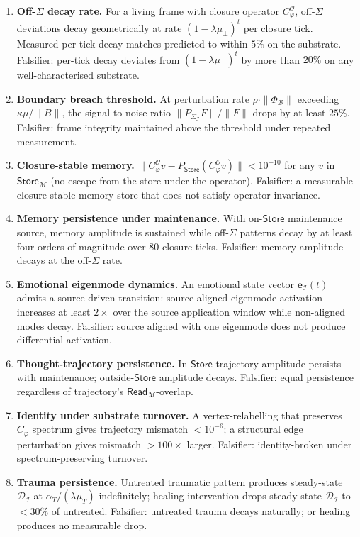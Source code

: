 \documentclass[11pt]{article}
\theoremstyle{plain}
\theoremstyle{definition}
\theoremstyle{remark}
\newcommand{\Ical}{\mathcal{I}}
\newcommand{\Ocal}{\mathcal{O}}
\newcommand{\Mcal}{\mathcal{M}}
\newcommand{\Bcal}{\mathcal{B}}
\newcommand{\Dcal}{\mathcal{D}}
\newcommand{\Cph}{C_\varphi}
\begin{document}
\begin{enumerate}[leftmargin=2em, label=\textbf{P\arabic*.}]
\item \textbf{Off-$\Sigma$ decay rate.} For a living frame with closure operator $\Cph^\Ocal$, off-$\Sigma$ deviations decay geometrically at rate $(1 - \lambda \mu_\perp)^t$ per closure tick. Measured per-tick decay matches predicted to within $5\%$ on the substrate. Falsifier: per-tick decay deviates from $(1 - \lambda \mu_\perp)^t$ by more than $20\%$ on any well-characterised substrate.
\item \textbf{Boundary breach threshold.} At perturbation rate $\rho \cdot \|\Phi_\Bcal\|$ exceeding $\kappa \mu / \|B\|$, the signal-to-noise ratio $\|P_{\Sigma_\Ical} F\| / \|F\|$ drops by at least $25\%$. Falsifier: frame integrity maintained above the threshold under repeated measurement.
\item \textbf{Closure-stable memory.} $\| \Cph^\Ocal v - P_{\mathsf{Store}}(\Cph^\Ocal v) \| < 10^{-10}$ for any $v$ in $\mathsf{Store}_\Mcal$ (no escape from the store under the operator). Falsifier: a measurable closure-stable memory store that does not satisfy operator invariance.
\item \textbf{Memory persistence under maintenance.} With on-$\mathsf{Store}$ maintenance source, memory amplitude is sustained while off-$\Sigma$ patterns decay by at least four orders of magnitude over 80 closure ticks. Falsifier: memory amplitude decays at the off-$\Sigma$ rate.
\item \textbf{Emotional eigenmode dynamics.} An emotional state vector $\mathbf{e}_\Ical(t)$ admits a source-driven transition: source-aligned eigenmode activation increases at least $2 \times$ over the source application window while non-aligned modes decay. Falsifier: source aligned with one eigenmode does not produce differential activation.
\item \textbf{Thought-trajectory persistence.} In-$\mathsf{Store}$ trajectory amplitude persists with maintenance; outside-$\mathsf{Store}$ amplitude decays. Falsifier: equal persistence regardless of trajectory's $\mathsf{Read}_\Mcal$-overlap.
\item \textbf{Identity under substrate turnover.} A vertex-relabelling that preserves $\Cph$ spectrum gives trajectory mismatch $< 10^{-6}$; a structural edge perturbation gives mismatch $> 100\times$ larger. Falsifier: identity-broken under spectrum-preserving turnover.
\item \textbf{Trauma persistence.} Untreated traumatic pattern produces steady-state $\Dcal_\Ical$ at $\alpha_T / (\lambda \mu_T)$ indefinitely; healing intervention drops steady-state $\Dcal_\Ical$ to $< 30\%$ of untreated. Falsifier: untreated trauma decays naturally; or healing produces no measurable drop.

\end{enumerate}
\end{document}
